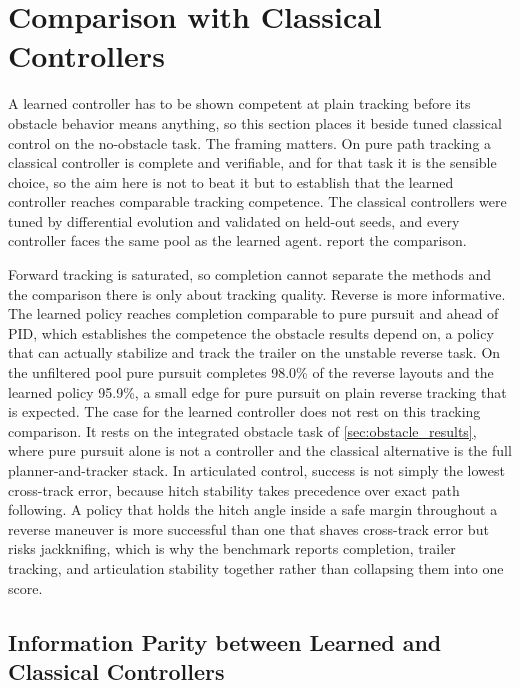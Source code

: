\section{Comparison with Classical Controllers}
\label{sec:benchmark}

A learned controller has to be shown competent at plain tracking before its obstacle behavior means anything, so this section places it beside tuned classical control on the no-obstacle task. The framing matters. On pure path tracking a classical controller is complete and verifiable, and for that task it is the sensible choice, so the aim here is not to beat it but to establish that the learned controller reaches comparable tracking competence. The classical controllers were tuned by differential evolution and validated on held-out seeds, and every controller faces the same pool as the learned agent.  report the comparison.



Forward tracking is saturated, so completion cannot separate the methods and the comparison there is only about tracking quality. Reverse is more informative. The learned policy reaches completion comparable to pure pursuit and ahead of PID, which establishes the competence the obstacle results depend on, a policy that can actually stabilize and track the trailer on the unstable reverse task. On the unfiltered pool pure pursuit completes 98.0\% of the reverse layouts and the learned policy 95.9\%, a small edge for pure pursuit on plain reverse tracking that is expected. The case for the learned controller does not rest on this tracking comparison. It rests on the integrated obstacle task of \cref{sec:obstacle_results}, where pure pursuit alone is not a controller and the classical alternative is the full planner-and-tracker stack. In articulated control, success is not simply the lowest cross-track error, because hitch stability takes precedence over exact path following. A policy that holds the hitch angle inside a safe margin throughout a reverse maneuver is more successful than one that shaves cross-track error but risks jackknifing, which is why the benchmark reports completion, trailer tracking, and articulation stability together rather than collapsing them into one score.

\subsection{Information Parity between Learned and Classical Controllers}
\label{sec:information_parity}

